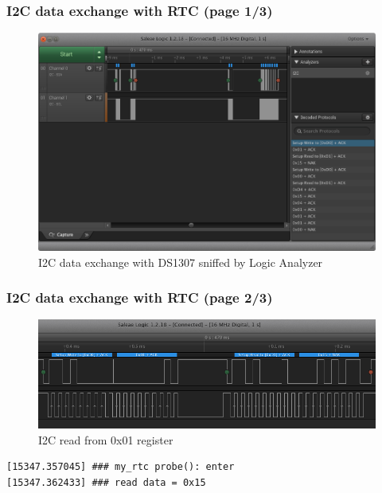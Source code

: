 \begin{frame}
  \frametitle{I2C data exchange with RTC (page 1/3)}
  \begin{figure}
    \centering
    \includegraphics[scale=0.38]{images/la-i2c-window.png}
    \caption{I2C data exchange with DS1307 sniffed by Logic Analyzer}
  \end{figure}
  \vspace*{-10mm}
\end{frame}

\begin{frame}[containsverbatim]
  \frametitle{I2C data exchange with RTC (page 2/3)}
  \begin{figure}
    \centering
    \includegraphics[scale=0.55]{images/la-i2c-read.png}
    \caption{I2C read from 0x01 register}
  \end{figure}
  \begin{lstlisting}[numbers=none]
[15347.357045] ### my_rtc probe(): enter
[15347.362433] ### read data = 0x15
  \end{lstlisting}
  \vspace*{-5mm}
\end{frame}

